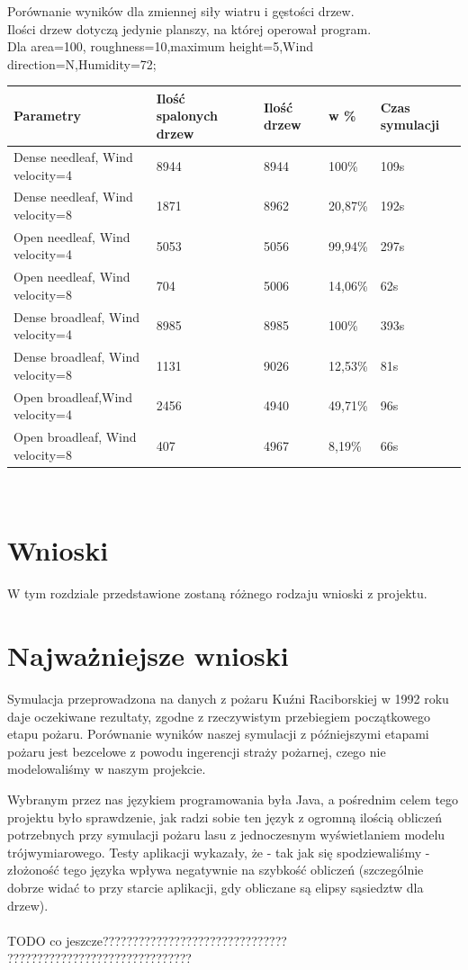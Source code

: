 \documentclass[a4paper, 11pt]{article}
\begin{document}
	Porównanie wyników dla zmiennej siły wiatru i gęstości drzew.\\
	Ilości drzew dotyczą jedynie planszy, na której operował program.\\
	Dla area=100, roughness=10,maximum height=5,Wind direction=N,Humidity=72;\\
	\begin{tabular}{|l|l|l|l|l|} \hline	
Parametry	& Ilość spalonych drzew & Ilość drzew	& w \% &Czas symulacji \\ \hline
Dense needleaf, Wind velocity=4 & 8944 & 8944 & 100\% &109s \\ \hline
Dense needleaf, Wind velocity=8 & 1871 & 8962 & 20,87\% &192s\\ \hline
Open needleaf, Wind velocity=4 & 5053 & 5056 & 99,94\%&297s\\ \hline
Open needleaf, Wind velocity=8 & 704 & 5006 & 14,06\%& 62s\\ \hline
Dense broadleaf, Wind velocity=4 & 8985 & 8985 & 100\% &393s\\ \hline %
Dense broadleaf, Wind velocity=8 & 1131 & 9026 & 12,53\%&81s\\ \hline
Open broadleaf,Wind velocity=4 & 2456 & 4940 & 49,71\% &96s\\ \hline
Open broadleaf, Wind velocity=8 & 407 & 4967 & 8,19\% &66s \\ \hline

\end{tabular}\\[1cm]
	\section{Wnioski}
	\indent
	
		W tym rozdziale przedstawione zostaną różnego rodzaju wnioski z projektu.
	\section*{Najważniejsze wnioski}
	\indent
	
		Symulacja przeprowadzona na danych z pożaru Kuźni Raciborskiej w 1992 roku daje oczekiwane rezultaty, zgodne z rzeczywistym przebiegiem początkowego etapu pożaru. Porównanie wyników naszej symulacji z późniejszymi etapami pożaru jest bezcelowe z powodu ingerencji straży pożarnej, czego nie modelowaliśmy w naszym projekcie. 
		
		Wybranym przez nas językiem programowania była Java, a pośrednim celem tego projektu było sprawdzenie, jak radzi sobie ten język z ogromną ilością obliczeń potrzebnych przy symulacji pożaru lasu z jednoczesnym wyświetlaniem modelu trójwymiarowego. Testy aplikacji wykazały, że - tak jak się spodziewaliśmy - złożoność tego języka wpływa negatywnie na szybkość obliczeń (szczególnie dobrze widać to przy starcie aplikacji, gdy obliczane są elipsy sąsiedztw dla drzew).\\
		\\
		TODO co jeszcze???????????????????????????????
		???????????????????????????????
\end{document}

